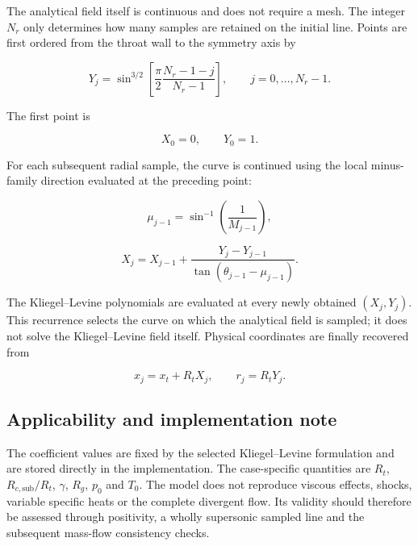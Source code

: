 The analytical field itself is continuous and does not require a mesh.  The
integer \(N_r\) only determines how many samples are retained on the initial
line.  Points are first ordered from the throat wall to the symmetry axis by

\begin{equation}
    Y_j=
    \sin^{3/2}\left[
        \frac{\pi}{2}\frac{N_r-1-j}{N_r-1}
    \right],
    \qquad j=0,\ldots,N_r-1.
\end{equation}

The first point is

\begin{equation}
    X_0=0,
    \qquad
    Y_0=1.
\end{equation}

For each subsequent radial sample, the curve is continued using the local
minus-family direction evaluated at the preceding point:

\begin{equation}
    \mu_{j-1}=\sin^{-1}\left(\frac{1}{M_{j-1}}\right),
\end{equation}

\begin{equation}
    \boxed{
    X_j=X_{j-1}
    +\frac{Y_j-Y_{j-1}}
    {\tan(\theta_{j-1}-\mu_{j-1})}
    }.
\end{equation}

The Kliegel--Levine polynomials are evaluated at every newly obtained
\((X_j,Y_j)\).  This recurrence selects the curve on which the analytical
field is sampled; it does not solve the Kliegel--Levine field itself.  Physical
coordinates are finally recovered from

\begin{equation}
    x_j=x_t+R_tX_j,
    \qquad
    r_j=R_tY_j.
\end{equation}


\subsection{Applicability and implementation note}

The coefficient values are fixed by the selected Kliegel--Levine formulation
and are stored directly in the implementation.  The case-specific quantities
are \(R_t\), \(R_{c,\mathrm{sub}}/R_t\), \(\gamma\), \(R_g\), \(p_0\) and
\(T_0\).  The model does not reproduce viscous effects, shocks, variable
specific heats or the complete divergent flow.  Its validity should therefore
be assessed through positivity, a wholly supersonic sampled line and the
subsequent mass-flow consistency checks.

